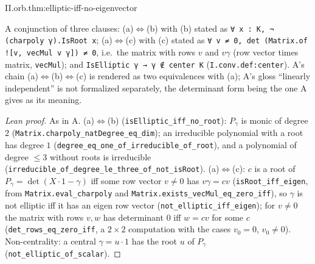 \begin{theorem}
\end{theorem}
\begin{tfformal}{II.orb.thm:elliptic-iff-no-eigenvector}
\begin{tffidelity}
A conjunction of three clauses: (a)$\Leftrightarrow$(b) with (b) stated as \texttt{∀ x : K, ¬ (charpoly γ).IsRoot x}; (a)$\Leftrightarrow$(c) with (c) stated as \texttt{∀ v ≠ 0, det (Matrix.of ![v, vecMul v γ]) ≠ 0}, i.e.\ the matrix with rows $v$ and $v\gamma$ (row vector times matrix, \texttt{vecMul}); and \texttt{IsElliptic γ → γ ∉ center K} (\texttt{I.conv.def:center}). A's chain (a)$\Leftrightarrow$(b)$\Leftrightarrow$(c) is rendered as two equivalences with (a); A's gloss ``linearly independent'' is not formalized separately, the determinant form being the one A gives as its meaning.
\end{tffidelity}
\end{tfformal}
\begin{proof}[Lean proof]
As in A. (a)$\Leftrightarrow$(b) (\texttt{isElliptic\_iff\_no\_root}): $P_\gamma$ is monic of degree $2$ (\texttt{Matrix.charpoly\_natDegree\_eq\_dim}); an irreducible polynomial with a root has degree $1$ (\texttt{degree\_eq\_one\_of\_irreducible\_of\_root}), and a polynomial of degree $\le3$ without roots is irreducible (\texttt{irreducible\_of\_degree\_le\_three\_of\_not\_isRoot}). (a)$\Leftrightarrow$(c): $c$ is a root of $P_\gamma=\det(X\cdot1-\gamma)$ iff some row vector $v\ne0$ has $v\gamma=cv$ (\texttt{isRoot\_iff\_eigen}, from \texttt{Matrix.eval\_charpoly} and \texttt{Matrix.exists\_vecMul\_eq\_zero\_iff}), so $\gamma$ is not elliptic iff it has an eigen row vector (\texttt{not\_elliptic\_iff\_eigen}); for $v\ne0$ the matrix with rows $v,w$ has determinant $0$ iff $w=cv$ for some $c$ (\texttt{det\_rows\_eq\_zero\_iff}, a $2\times2$ computation with the cases $v_0=0$, $v_0\ne0$). Non-centrality: a central $\gamma=u\cdot1$ has the root $u$ of $P_\gamma$ (\texttt{not\_elliptic\_of\_scalar}).
\end{proof}

